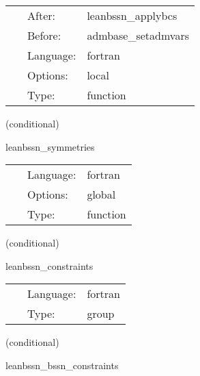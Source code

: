 \hspace{5mm}

 \begin{tabular*}{160mm}{cll} 
~ & After:  & leanbssn\_applybcs \\ 
~ & Before:  & admbase\_setadmvars \\ 
~ & Language:  & fortran \\ 
~ & Options:  & local \\ 
~ & Type:  & function \\ 
\end{tabular*} 


\vspace{5mm}

   (conditional) 

\hspace{5mm} leanbssn\_symmetries 

\hspace{5mm}{\it register symmetries of the bssn grid functions } 


\hspace{5mm}

 \begin{tabular*}{160mm}{cll} 
~ & Language:  & fortran \\ 
~ & Options:  & global \\ 
~ & Type:  & function \\ 
\end{tabular*} 


\vspace{5mm}

   (conditional) 

\hspace{5mm} leanbssn\_constraints 

\hspace{5mm}{\it compute constraints } 


\hspace{5mm}

 \begin{tabular*}{160mm}{cll} 
~ & Language:  & fortran \\ 
~ & Type:  & group \\ 
\end{tabular*} 


\vspace{5mm}

   (conditional) 

\hspace{5mm} leanbssn\_bssn\_constraints 

